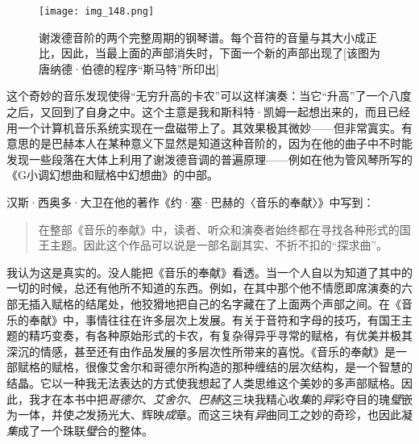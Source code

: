 \begin{sidewaysfigure}
\texttt{[image: img\_148.png]}
\caption[谢泼德音阶的两个完整周期的钢琴谱。]
  {谢泼德音阶的两个完整周期的钢琴谱。每个音符的音量与其大小成正比，因此，当最上面的声部消失时，下面一个新的声部出现了[该图为唐纳德·伯德的程序“斯马特”所印出] }
\end{sidewaysfigure}

这个奇妙的音乐发现使得“无穷升高的卡农”可以这样演奏：当它“升高”了一个八度之后，又回到了自身之中。这个主意是我和斯科特·凯姆一起想出来的，而且已经用一个计算机音乐系统实现在一盘磁带上了。其效果极其微妙——但非常寘实。有意思的是巴赫本人在某种意义下显然是知道这种音阶的，因为在他的曲子中不时能发现一些段落在大体上利用了谢泼德音调的普遍原理——例如在他为管风琴所写的《G小调幻想曲和赋格中幻想曲》的中部。

汉斯·西奥多·大卫在他的著作《约·塞·巴赫的〈音乐的奉献〉》中写到：

\begin{quote}
在整部《音乐的奉献》中，读者、听众和演奏者始终都在寻找各种形式的国王主题。因此这个作品可以说是一部名副其实、不折不扣的“探求曲”。
\end{quote}

我认为这是真实的。没人能把《音乐的奉献》看透。当一个人自以为知道了其中的一切的时候，总还有他所不知道的东西。例如，在其中那个他不情愿即席演奏的六部无插入赋格的结尾处，他狡猾地把自己的名字藏在了上面两个声部之间。在《音乐的奉献》中，事情往往在许多层次上发展。有关于音符和字母的技巧，有国王主题的精巧变奏，有各种原始形式的卡农，有复杂得异乎寻常的赋格，有优美并极其深沉的情感，甚至还有由作品发展的多层次性所带来的喜悦。《音乐的奉献》是一部赋格的赋格，很像艾舍尔和哥德尔所构造的那种缠结的层次结构，是一个智慧的结晶。它以一种我无法表达的方式使我想起了人类思维这个美妙的多声部赋格。因此，我才在本书中把\emph{哥德尔}、\emph{艾舍尔}、\emph{巴赫}这三块我精心收\emph{集}的\emph{异}彩夺目的瑰\emph{璧}嵌为一体，并使\emph{之}发扬光大、辉映\emph{成}章。而这三块有\emph{异}曲同工之妙的奇珍，也因此凝\emph{集}成了一个珠联\emph{璧}合的整体。
